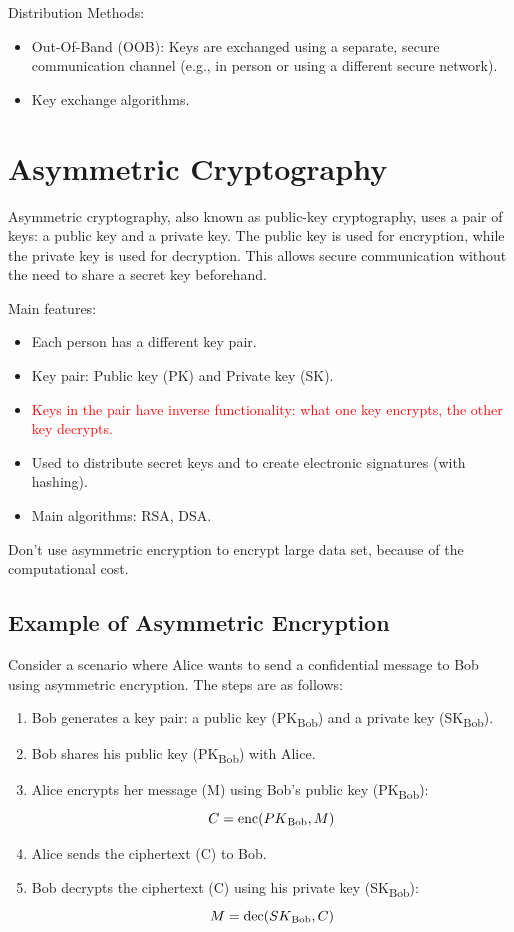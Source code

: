 Distribution Methods:
\begin{itemize}
    \item Out-Of-Band (OOB): Keys are exchanged using a separate, secure communication channel (e.g., in person or using a different secure network).
    \item Key exchange algorithms.
\end{itemize}

\section{Asymmetric Cryptography}
Asymmetric cryptography, also known as public-key cryptography, uses a pair of keys: a public key and a private key. The public key is used for encryption, while the private key is used for decryption. This allows secure communication without the need to share a secret key beforehand.

\vspace{0.5cm}

\noindent Main features:
\begin{itemize}
    \item Each person has a different key pair.
    \item Key pair: Public key (PK) and Private key (SK).
    \item \textcolor{Red}{Keys in the pair have inverse functionality: what one key encrypts, the other key decrypts.}
    \item Used to distribute secret keys and to create electronic signatures (with hashing).
    \item Main algorithms: RSA, DSA.
\end{itemize}

\begin{tcolorbox}[colback=red!10!white, colframe=red!70!black, coltitle=white, title=Beware]
Don't use asymmetric encryption to encrypt large data set, because of the computational cost.
\end{tcolorbox}

\subsection*{Example of Asymmetric Encryption}
Consider a scenario where Alice wants to send a confidential message to Bob using asymmetric encryption. The steps are as follows:

\begin{enumerate}
    \item Bob generates a key pair: a public key (PK\textsubscript{Bob}) and a private key (SK\textsubscript{Bob}).
    \item Bob shares his public key (PK\textsubscript{Bob}) with Alice.
    \item Alice encrypts her message (M) using Bob's public key (PK\textsubscript{Bob}):
    \[
        C = \text{enc}(PK\textsubscript{Bob}, M)
    \]
    \item Alice sends the ciphertext (C) to Bob.
    \item Bob decrypts the ciphertext (C) using his private key (SK\textsubscript{Bob}):
    \[
        M = \text{dec}(SK\textsubscript{Bob}, C)
    \]
\end{enumerate}

